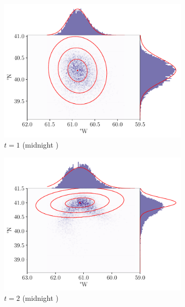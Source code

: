 \begin{figure}
	\begin{center}
		\begin{subfigure}{0.49\textwidth}
			\includegraphics[width=\textwidth]{chp06_applications/figures/gulf_stream/traj_stoch_em_1.0}
			\caption{\(t = 1\) (midnight )}
		\end{subfigure}
		\begin{subfigure}{0.49\textwidth}
			\includegraphics[width=\textwidth]{chp06_applications/figures/gulf_stream/traj_stoch_em_2.0}
			\caption{\(t = 2\) (midnight )}
		\end{subfigure}
		\begin{subfigure}{0.49\textwidth}

\end{subfigure}
\end{center}
\end{figure}
